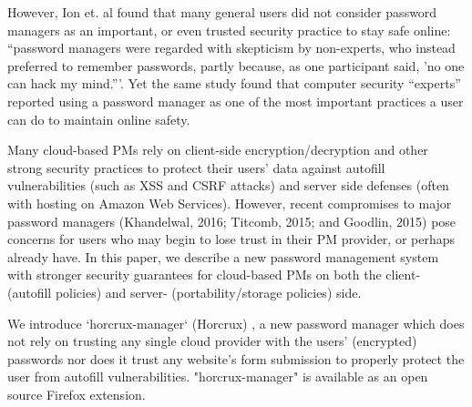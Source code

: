 \documentclass[conference]{IEEEtran}
\begin{document}
However, Ion et. al \cite{ion2015no} found
that many general users did not consider password managers as an important, or
even trusted security practice to stay safe online: ``password managers were
regarded with skepticism by non-experts, who instead preferred to remember
passwords, partly because, as one participant said, 'no one can hack my mind.'''.
Yet the same study found that computer security ``experts'' reported using a
password manager as one of the most important practices a user can do to
maintain online safety.


Many cloud-based PMs rely on client-side encryption/decryption and other strong
security practices to protect their users' data against autofill vulnerabilities
(such as XSS and CSRF attacks) and server side defenses (often with hosting on
Amazon Web Services). However, recent compromises to major password managers
(Khandelwal, 2016; Titcomb, 2015; and Goodlin, 2015) pose concerns for users who
may begin to lose trust in their PM provider, or perhaps already have. In this
paper, we describe a new password management system with stronger security
guarantees for cloud-based
PMs on both the client- (autofill policies) and server- (portability/storage
policies) side.  

We introduce `horcrux-manager` (Horcrux) , a new password manager which
does not rely on trusting any single cloud provider with the users' (encrypted) passwords  
nor does it trust any website's form submission to properly protect the user
from autofill vulnerabilities. "horcrux-manager" is available  as an open source
Firefox extension.
\end{document}
